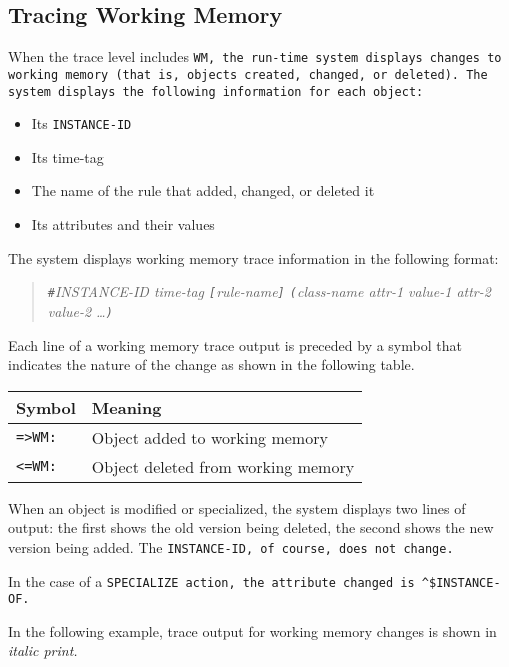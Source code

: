 \subsection{Tracing Working Memory}

When the trace level includes \tt{WM}, the run-time system displays
changes to working memory (that is, objects created, changed, or
deleted). The system displays the following information for each
object:

\begin{itemize}
\item Its \tt{INSTANCE-ID}
\item Its time-tag
\item The name of the rule that added, changed, or deleted it
\item Its attributes and their values
\end{itemize}

The system displays working memory trace information in the
following format:

\begin{quote}
  \verb|#|\it{INSTANCE-ID} \it{time-tag}
  \verb|[|\it{rule-name}\verb|]| \verb|(|\it{class-name} \it{attr-1}
  \it{value-1} \it{attr-2} \it{value-2} \ldots\verb|)|
\end{quote}

Each line of a working memory trace output is preceded by a symbol
that indicates the nature of the change as shown in the following
table.

\begin{center}
  \begin{tabular}{ll}
    \toprule
    Symbol & Meaning \\
    \midrule
    \verb|=>WM:| & Object added to working memory \\
    \verb|<=WM:| & Object deleted from working memory \\
    \bottomrule
  \end{tabular}
\end{center}

When an object is modified or specialized, the system displays two
lines of output: the first shows the old version being deleted, the
second shows the new version being added. The \tt{INSTANCE-ID}, of
course, does not change.

In the case of a \tt{SPECIALIZE} action, the attribute changed is
\verb|^$INSTANCE-OF|.

In the following example, trace output for working memory
changes is shown in \it{italic} print.

